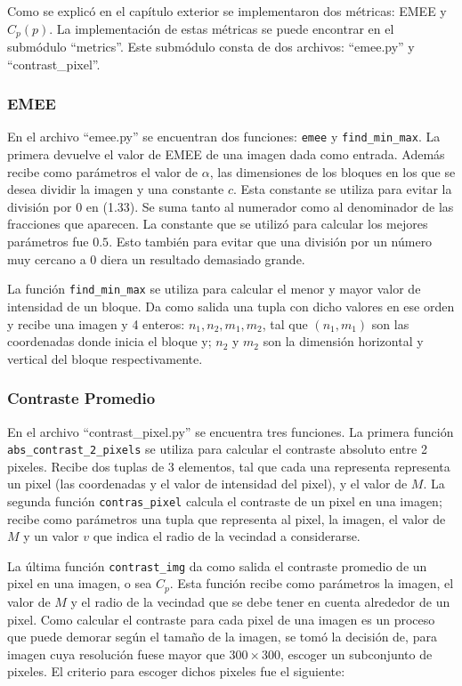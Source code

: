 Como se explic\'o en el cap\'itulo exterior se implementaron dos m\'etricas: EMEE y $C_p(p)$. La implementaci\'on de estas m\'etricas se puede encontrar en el subm\'odulo ``metrics''. Este subm\'odulo consta de dos archivos: ``emee.py'' y ``contrast\_pixel''. 

\subsubsection{EMEE}
En el archivo ``emee.py'' se encuentran dos funciones: \verb|emee| y \verb|find_min_max|. La primera devuelve el valor de EMEE de una imagen dada como entrada. Adem\'as recibe como par\'ametros el valor de $\alpha$, las dimensiones de los bloques en los que se desea dividir la imagen y una constante $c$. Esta constante se utiliza para evitar la divisi\'on por $0$ en (1.33). Se suma tanto al numerador como al denominador de las fracciones que aparecen. La constante que se utiliz\'o para calcular los mejores par\'ametros fue $0.5$. Esto tambi\'en para evitar que una divisi\'on por un n\'umero muy cercano a 0 diera un resultado demasiado grande. 

La funci\'on \verb|find_min_max| se utiliza para calcular el menor y mayor valor de intensidad de un bloque. Da como salida una tupla con dicho valores en ese orden y recibe una imagen y 4 enteros: $n_1,n_2,m_1,m_2$, tal que $(n_1,m_1)$ son las coordenadas donde inicia el bloque y; $n_2$ y $m_2$ son la dimensi\'on horizontal y vertical del bloque respectivamente.

\subsubsection{Contraste Promedio}
En el archivo ``contrast\_pixel.py'' se encuentra tres funciones. La primera funci\'on \verb|abs_contrast_2_pixels| se utiliza para calcular el contraste absoluto entre 2 pixeles. Recibe dos tuplas de 3 elementos, tal que cada una representa representa un pixel (las coordenadas y el valor de intensidad del pixel), y el valor de $M$.  La segunda funci\'on \verb|contras_pixel| calcula el contraste de un pixel en una imagen; recibe como par\'ametros una tupla que representa al pixel, la imagen, el valor de $M$ y un valor $v$ que indica el radio de la vecindad a considerarse. 

La \'ultima funci\'on \verb|contrast_img| da como salida el contraste promedio de un pixel en una imagen, o sea $C_p$. Esta funci\'on recibe como par\'ametros la imagen, el valor de $M$ y el radio de la vecindad que se debe tener en cuenta alrededor de un pixel. Como calcular el contraste para cada pixel de una imagen es un proceso que puede demorar seg\'un el tama\~no de la imagen, se tom\'o la decisi\'on de, para imagen cuya resoluci\'on fuese mayor que $300\times300$, escoger un subconjunto de pixeles. El criterio para escoger dichos pixeles fue el siguiente:

